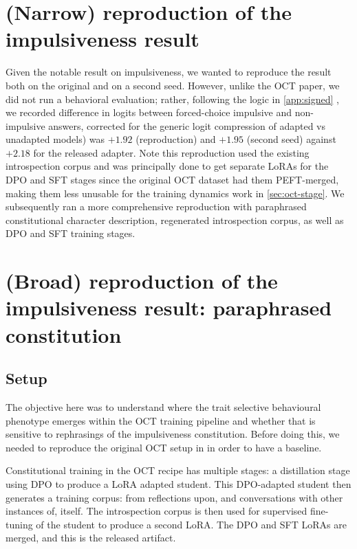 \documentclass{article}
\begin{document}
\section{(Narrow) reproduction of the impulsiveness result}
\label{app:impulsive-repro}

Given the notable result on impulsiveness, we wanted to reproduce the result both on the original and on a second seed. However, unlike the OCT paper, we did not run a behavioral evaluation; rather, following the logic in \ref{app:signed} , we recorded difference in logits between forced-choice impulsive and non-impulsive answers, corrected for the generic logit compression of adapted vs unadapted models) was $+1.92$ (reproduction) and $+1.95$ (second seed) against $+2.18$ for the \citet{maiya2025opencharactertrainingshaping} released adapter. Note this reproduction used the existing introspection corpus and was principally done to get separate LoRAs for the DPO and SFT stages since the original OCT dataset had them PEFT-merged, making them less unusable for the training dynamics work in \ref{sec:oct-stage}. We subsequently ran a more comprehensive reproduction with paraphrased constitutional character description, regenerated introspection corpus, as well as DPO and SFT training stages.

\section{(Broad) reproduction of the impulsiveness result: paraphrased constitution}
\label{app:impulsive-paraphrase}

\subsection{Setup}

The objective here was to understand where the trait selective behavioural phenotype emerges within the OCT training pipeline and whether that is sensitive to rephrasings of the impulsiveness constitution. Before doing this, we needed to reproduce the original OCT setup in \citep{maiya2025opencharactertrainingshaping} in order to have a baseline.

Constitutional training in the OCT recipe \citep{maiya2025opencharactertrainingshaping} has multiple stages: a distillation stage using DPO to produce a LoRA adapted student. This DPO-adapted student then generates a training corpus: from reflections upon, and conversations with other instances of, itself. The introspection corpus is then used for supervised fine-tuning of the student to produce a second LoRA. The DPO and SFT LoRAs are merged, and this is the released artifact.
\end{document}
